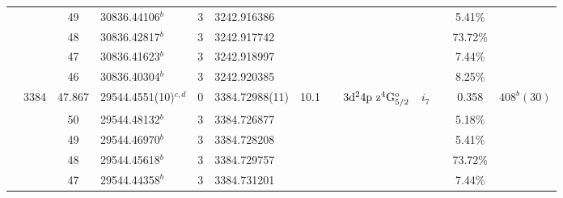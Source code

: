 \begin{table*}
\begin{center}
{\begin{tabular}{:l;l;c;l;c;l;c;l;l;c;c;c;c}
\rowstyle{\itshape}               &        & 49        & 30836.44106$^{b}$                & 3 &   3242.916386      &      & $                                        $ & $                                        $ & $      $ &              & 5.41\%    & $     ^{}     $\\
\rowstyle{\itshape}               &        & 48        & 30836.42817$^{b}$                & 3 &   3242.917742      &      & $                                        $ & $                                        $ & $      $ &              & 73.72\%   & $     ^{}     $\\
\rowstyle{\itshape}               &        & 47        & 30836.41623$^{b}$                & 3 &   3242.918997      &      & $                                        $ & $                                        $ & $      $ &              & 7.44\%    & $     ^{}     $\\
\rowstyle{\itshape}               &        & 46        & 30836.40304$^{b}$                & 3 &   3242.920385      &      & $                                        $ & $                                        $ & $      $ &              & 8.25\%    & $     ^{}     $\\
                                  & 3384   & 47.867    & 29544.4551(10)$^{c,d}$           & 0 &    3384.72988(11)  & 10.1 & $                                        $ & $3\rm{d}^24\rm{p~z}^4\rm{G}_{5/2}^{\rm o}$ & $i_{7} $ &              & 0.358     & $  408^{b}(30) $\\
\rowstyle{\itshape}               &        & 50        & 29544.48132$^{b}$                & 3 &   3384.726877      &      & $                                        $ & $                                        $ & $      $ &              & 5.18\%    & $     ^{}     $\\
\rowstyle{\itshape}               &        & 49        & 29544.46970$^{b}$                & 3 &   3384.728208      &      & $                                        $ & $                                        $ & $      $ &              & 5.41\%    & $     ^{}     $\\
\rowstyle{\itshape}               &        & 48        & 29544.45618$^{b}$                & 3 &   3384.729757      &      & $                                        $ & $                                        $ & $      $ &              & 73.72\%   & $     ^{}     $\\
\rowstyle{\itshape}               &        & 47        & 29544.44358$^{b}$                & 3 &   3384.731201      &      & $                                        $ & $                                        $ & $      $ &              & 7.44\%    & $     ^{}     $\\

\end{tabular}}
\end{center}
\end{table*}
